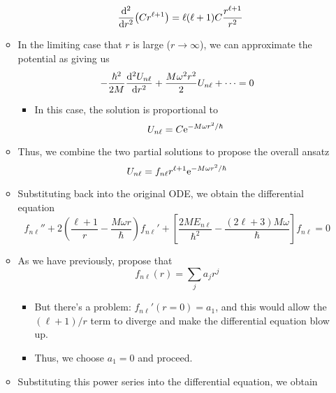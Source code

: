 \documentclass[../notes.tex]{subfiles}
\begin{document}
\begin{itemize}
\begin{itemize}
\begin{itemize}
\begin{align*}
                \dv[2]{r}(Cr^{\ell+1}) &= \ell(\ell+1)C\frac{r^{\ell+1}}{r^2}
            \end{align*}
        \end{itemize}
        \item In the limiting case that $r$ is large ($r\to\infty$), we can approximate the potential as giving us
        \begin{equation*}
            -\frac{\hbar^2}{2M}\dv[2]{U_{n\ell}}{r}+\frac{M\omega^2r^2}{2}U_{n\ell}+\cdots = 0
        \end{equation*}
        \begin{itemize}
            \item In this case, the solution is proportional to
            \begin{equation*}
                U_{n\ell} = C\e[-M\omega r^2/\hbar]
            \end{equation*}
        \end{itemize}
        \item Thus, we combine the two partial solutions to propose the overall ansatz
        \begin{equation*}
            U_{n\ell} = f_{n\ell}r^{\ell+1}\e[-M\omega r^2/\hbar]
        \end{equation*}
        \item Substituting back into the original ODE, we obtain the differential equation
        \begin{equation*}
            f_{n\ell}''+2\left( \frac{\ell+1}{r}-\frac{M\omega r}{\hbar} \right)f_{n\ell}'+\left[ \frac{2ME_{n\ell}}{\hbar^2}-\frac{(2\ell+3)M\omega}{\hbar} \right]f_{n\ell} = 0
        \end{equation*}
        \item As we have previously, propose that
        \begin{equation*}
            f_{n\ell}(r) = \sum_ja_jr^j
        \end{equation*}
        \begin{itemize}
            \item But there's a problem: $f_{n\ell}'(r=0)=a_1$, and this would allow the $(\ell+1)/r$ term to diverge and make the differential equation blow up.
            \item Thus, we choose $a_1=0$ and proceed.
        \end{itemize}
        \item Substituting this power series into the differential equation, we obtain
        \begin{equation*}

\end{equation*}
\end{itemize}
\end{itemize}
\end{document}
